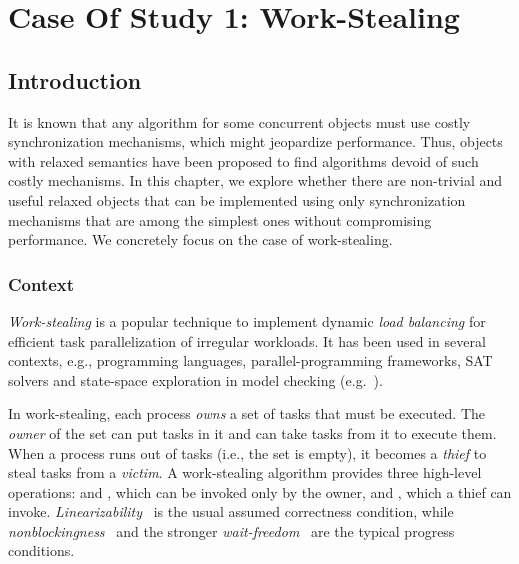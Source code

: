 \chapter{Case Of Study 1: Work-Stealing}

\section{Introduction}

It is known that any algorithm for some concurrent objects must use costly synchronization mechanisms, which might jeopardize performance. Thus, objects with relaxed semantics have been proposed to find algorithms devoid of such costly mechanisms. In this chapter, we explore whether there are non-trivial and useful relaxed objects that can be implemented using only synchronization mechanisms that are among the simplest ones without compromising performance. We concretely focus on the case of work-stealing.

\subsection{Context}

\emph{Work-stealing} is a popular technique to implement dynamic \emph{load balancing} for efficient task parallelization of irregular workloads. It has been used in several contexts, e.g., programming languages, parallel-programming frameworks, SAT solvers and state-space exploration in model checking (e.g.~\cite{DBLP_journals_tpds_AyguadeCDHLMTUZ09, DBLP_journals_jpdc_BlumofeJKLRZ96, CGSDKEPS05, DBLP_conf_jvm_FloodDSZ01, DBLP_conf_pldi_FrigoLR98, DBLP_conf_java_Lea00, DBLP_conf_hpca_RangerRPBK07}).

In work-stealing, each process \emph{owns} a set of tasks that must be executed. The \emph{owner} of the set can put tasks in it and can take tasks from it to execute them. When a process runs out of tasks (i.e., the set is empty), it becomes a \emph{thief} to steal tasks from a \emph{victim}. A work-stealing algorithm provides three high-level operations: \Put and \Take, which can be invoked only by the owner, and \Steal, which a thief can invoke. \emph{Linearizability}~\cite{DBLP_journals_toplas_HerlihyW90} is the usual assumed correctness condition, while \emph{nonblockingness}~\cite{DBLP_journals_toplas_HerlihyW90} and the stronger \emph{wait-freedom}~\cite{DBLP_conf_spaa_Herlihy91} are the typical  progress conditions.

